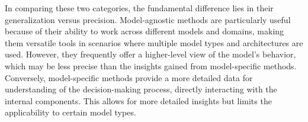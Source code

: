 In comparing these two categories, the fundamental difference lies in their generalization versus precision.
Model-agnostic methods are particularly useful because of their ability to work across different models and domains,
making them versatile tools in scenarios where multiple model types and architectures are used.
However, they  frequently offer a higher-level view of the model’s behavior, which may be less precise than the
insights gained from model-specific methods.
Conversely, model-specific methods provide a more detailed data for understanding of the decision-making process,
directly interacting with the internal components.
This allows for more detailed insights but limits the applicability to certain model types.





